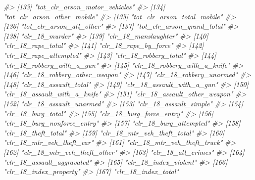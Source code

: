 \documentclass[
]{krantz}
\makeatletter
\newenvironment{Shaded}{\begin{snugshade}}{\end{snugshade}}
\newcommand{\CommentTok}[1]{\textcolor[rgb]{0.37,0.37,0.37}{\textit{#1}}}
\newenvironment{kframe}{%
\medskip{}
\setlength{\fboxsep}{.8em}
 \def\at@end@of@kframe{}%
 \ifinner\ifhmode%
  \def\at@end@of@kframe{\end{minipage}}%
  \begin{minipage}{\columnwidth}%
 \fi\fi%
 \def\FrameCommand##1{\hskip\@totalleftmargin \hskip-\fboxsep
 \colorbox{shadecolor}{##1}\hskip-\fboxsep
     \hskip-\linewidth \hskip-\@totalleftmargin \hskip\columnwidth}%
 \MakeFramed {\advance\hsize-\width
   \@totalleftmargin\z@ \linewidth\hsize
   \@setminipage}}%
 {\par\unskip\endMakeFramed%
 \at@end@of@kframe}
\renewenvironment{Shaded}{\begin{kframe}}{\end{kframe}}
\makeatother
\begin{document}
\begin{Shaded}
\begin{Highlighting}[]
\CommentTok{\#\textgreater{} [133] "tot\_clr\_arson\_motor\_vehicles"    }
\CommentTok{\#\textgreater{} [134] "tot\_clr\_arson\_other\_mobile"      }
\CommentTok{\#\textgreater{} [135] "tot\_clr\_arson\_total\_mobile"      }
\CommentTok{\#\textgreater{} [136] "tot\_clr\_arson\_all\_other"         }
\CommentTok{\#\textgreater{} [137] "tot\_clr\_arson\_grand\_total"       }
\CommentTok{\#\textgreater{} [138] "clr\_18\_murder"                   }
\CommentTok{\#\textgreater{} [139] "clr\_18\_manslaughter"             }
\CommentTok{\#\textgreater{} [140] "clr\_18\_rape\_total"               }
\CommentTok{\#\textgreater{} [141] "clr\_18\_rape\_by\_force"            }
\CommentTok{\#\textgreater{} [142] "clr\_18\_rape\_attempted"           }
\CommentTok{\#\textgreater{} [143] "clr\_18\_robbery\_total"            }
\CommentTok{\#\textgreater{} [144] "clr\_18\_robbery\_with\_a\_gun"       }
\CommentTok{\#\textgreater{} [145] "clr\_18\_robbery\_with\_a\_knife"     }
\CommentTok{\#\textgreater{} [146] "clr\_18\_robbery\_other\_weapon"     }
\CommentTok{\#\textgreater{} [147] "clr\_18\_robbery\_unarmed"          }
\CommentTok{\#\textgreater{} [148] "clr\_18\_assault\_total"            }
\CommentTok{\#\textgreater{} [149] "clr\_18\_assault\_with\_a\_gun"       }
\CommentTok{\#\textgreater{} [150] "clr\_18\_assault\_with\_a\_knife"     }
\CommentTok{\#\textgreater{} [151] "clr\_18\_assault\_other\_weapon"     }
\CommentTok{\#\textgreater{} [152] "clr\_18\_assault\_unarmed"          }
\CommentTok{\#\textgreater{} [153] "clr\_18\_assault\_simple"           }
\CommentTok{\#\textgreater{} [154] "clr\_18\_burg\_total"               }
\CommentTok{\#\textgreater{} [155] "clr\_18\_burg\_force\_entry"         }
\CommentTok{\#\textgreater{} [156] "clr\_18\_burg\_nonforce\_entry"      }
\CommentTok{\#\textgreater{} [157] "clr\_18\_burg\_attempted"           }
\CommentTok{\#\textgreater{} [158] "clr\_18\_theft\_total"              }
\CommentTok{\#\textgreater{} [159] "clr\_18\_mtr\_veh\_theft\_total"      }
\CommentTok{\#\textgreater{} [160] "clr\_18\_mtr\_veh\_theft\_car"        }
\CommentTok{\#\textgreater{} [161] "clr\_18\_mtr\_veh\_theft\_truck"      }
\CommentTok{\#\textgreater{} [162] "clr\_18\_mtr\_veh\_theft\_other"      }
\CommentTok{\#\textgreater{} [163] "clr\_18\_all\_crimes"               }
\CommentTok{\#\textgreater{} [164] "clr\_18\_assault\_aggravated"       }
\CommentTok{\#\textgreater{} [165] "clr\_18\_index\_violent"            }
\CommentTok{\#\textgreater{} [166] "clr\_18\_index\_property"           }
\CommentTok{\#\textgreater{} [167] "clr\_18\_index\_total"              }

\end{Highlighting}
\end{Shaded}
\end{document}
